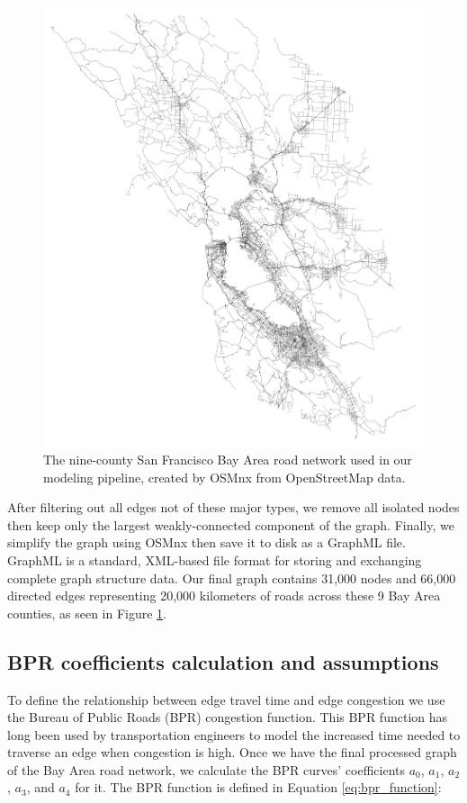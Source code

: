 \begin{figure}[htbp]
    \center
    \includegraphics[width=\textwidth]
    {graphics/bay_area_network.png}
    \caption{The nine-county San Francisco Bay Area road network used in our modeling pipeline, created by OSMnx from OpenStreetMap data.}
    \label{fig:bay_area_road_network}
\end{figure}

After filtering out all edges not of these major types, we remove all isolated nodes then keep only the largest weakly-connected component of the graph. Finally, we simplify the graph using OSMnx then save it to disk as a GraphML file. GraphML is a standard, XML-based file format for storing and exchanging complete graph structure data. Our final graph contains 31,000 nodes and 66,000 directed edges representing 20,000 kilometers of roads across these 9 Bay Area counties, as seen in Figure \ref{fig:bay_area_road_network}.

\subsection{BPR coefficients calculation and assumptions}
To define the relationship between edge travel time and edge congestion we use the Bureau of Public Roads (BPR) congestion function. This BPR function has long been used by transportation engineers to model the increased time needed to traverse an edge when congestion is high. Once we have the final processed graph of the Bay Area road network, we calculate the BPR  curves' coefficients $a_0$, $a_1$, $a_2$, $a_3$, and $a_4$ for it. The BPR function is defined in Equation \ref{eq:bpr_function}:

